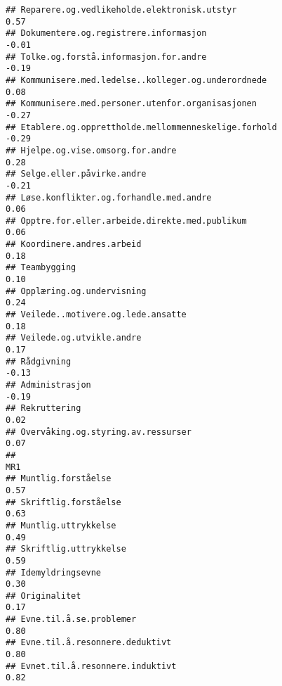 \documentclass[
]{article}
\begin{document}
\begin{verbatim}
## Reparere.og.vedlikeholde.elektronisk.utstyr                                       0.57
## Dokumentere.og.registrere.informasjon                                            -0.01
## Tolke.og.forstå.informasjon.for.andre                                            -0.19
## Kommunisere.med.ledelse..kolleger.og.underordnede                                 0.08
## Kommunisere.med.personer.utenfor.organisasjonen                                  -0.27
## Etablere.og.opprettholde.mellommenneskelige.forhold                              -0.29
## Hjelpe.og.vise.omsorg.for.andre                                                   0.28
## Selge.eller.påvirke.andre                                                        -0.21
## Løse.konflikter.og.forhandle.med.andre                                            0.06
## Opptre.for.eller.arbeide.direkte.med.publikum                                     0.06
## Koordinere.andres.arbeid                                                          0.18
## Teambygging                                                                       0.10
## Opplæring.og.undervisning                                                         0.24
## Veilede..motivere.og.lede.ansatte                                                 0.18
## Veilede.og.utvikle.andre                                                          0.17
## Rådgivning                                                                       -0.13
## Administrasjon                                                                   -0.19
## Rekruttering                                                                      0.02
## Overvåking.og.styring.av.ressurser                                                0.07
##                                                                                    MR1
## Muntlig.forståelse                                                                0.57
## Skriftlig.forståelse                                                              0.63
## Muntlig.uttrykkelse                                                               0.49
## Skriftlig.uttrykkelse                                                             0.59
## Idemyldringsevne                                                                  0.30
## Originalitet                                                                      0.17
## Evne.til.å.se.problemer                                                           0.80
## Evne.til.å.resonnere.deduktivt                                                    0.80
## Evnet.til.å.resonnere.induktivt                                                   0.82

\end{verbatim}
\end{document}
